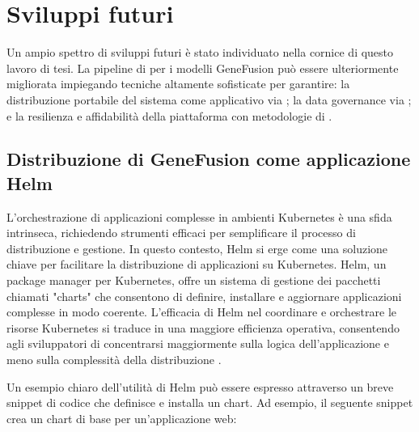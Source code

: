 % 
% 
% 



\clearpage
\cleardoublepage

\chapter{Sviluppi futuri}

Un ampio spettro di sviluppi futuri è stato individuato nella cornice di questo lavoro di tesi. La pipeline di  per i modelli GeneFusion può essere ulteriormente migliorata impiegando tecniche altamente sofisticate per garantire: la distribuzione portabile del sistema come applicativo  via ; la data governance via ; e la resilienza e affidabilità della piattaforma con metodologie di .

\section{Distribuzione di GeneFusion come applicazione Helm}

L'orchestrazione di applicazioni complesse in ambienti Kubernetes è una sfida intrinseca, richiedendo strumenti efficaci per semplificare il processo di distribuzione e gestione. In questo contesto, Helm si erge come una soluzione chiave per facilitare la distribuzione di applicazioni su Kubernetes. Helm, un package manager per Kubernetes, offre un sistema di gestione dei pacchetti chiamati "charts" che consentono di definire, installare e aggiornare applicazioni complesse in modo coerente. L'efficacia di Helm nel coordinare e orchestrare le risorse Kubernetes si traduce in una maggiore efficienza operativa, consentendo agli sviluppatori di concentrarsi maggiormente sulla logica dell'applicazione e meno sulla complessità della distribuzione \cite{helm_official}.

Un esempio chiaro dell'utilità di Helm può essere espresso attraverso un breve snippet di codice che definisce e installa un chart. Ad esempio, il seguente snippet crea un chart di base per un'applicazione web:

